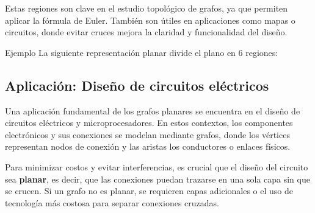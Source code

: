 Estas regiones son clave en el estudio topológico de grafos, ya que permiten aplicar la fórmula de Euler. También son útiles en aplicaciones como mapas o circuitos, donde evitar cruces mejora la claridad y funcionalidad del diseño.



\begin{exampleblock}{Ejemplo}
La siguiente representación planar divide el plano en 6 regiones:
\begin{center}
\end{center}
\end{exampleblock}


\subsection{Aplicación: Diseño de circuitos eléctricos}

Una aplicación fundamental de los grafos planares se encuentra en el diseño de circuitos eléctricos y microprocesadores. En estos contextos, los componentes electrónicos y sus conexiones se modelan mediante grafos, donde los vértices representan nodos de conexión y las aristas los conductores o enlaces físicos.

\medskip

Para minimizar costos y evitar interferencias, es crucial que el diseño del circuito sea \textbf{planar}, es decir, que las conexiones puedan trazarse en una sola capa sin que se crucen. Si un grafo no es planar, se requieren capas adicionales o el uso de tecnología más costosa para separar conexiones cruzadas.

